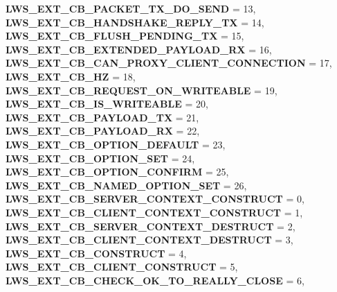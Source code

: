 \begin{DoxyCompactItemize}
{\bfseries L\+W\+S\+\_\+\+E\+X\+T\+\_\+\+C\+B\+\_\+\+P\+A\+C\+K\+E\+T\+\_\+\+T\+X\+\_\+\+D\+O\+\_\+\+S\+E\+ND} = 13, 
\newline
{\bfseries L\+W\+S\+\_\+\+E\+X\+T\+\_\+\+C\+B\+\_\+\+H\+A\+N\+D\+S\+H\+A\+K\+E\+\_\+\+R\+E\+P\+L\+Y\+\_\+\+TX} = 14, 
{\bfseries L\+W\+S\+\_\+\+E\+X\+T\+\_\+\+C\+B\+\_\+\+F\+L\+U\+S\+H\+\_\+\+P\+E\+N\+D\+I\+N\+G\+\_\+\+TX} = 15, 
{\bfseries L\+W\+S\+\_\+\+E\+X\+T\+\_\+\+C\+B\+\_\+\+E\+X\+T\+E\+N\+D\+E\+D\+\_\+\+P\+A\+Y\+L\+O\+A\+D\+\_\+\+RX} = 16, 
{\bfseries L\+W\+S\+\_\+\+E\+X\+T\+\_\+\+C\+B\+\_\+\+C\+A\+N\+\_\+\+P\+R\+O\+X\+Y\+\_\+\+C\+L\+I\+E\+N\+T\+\_\+\+C\+O\+N\+N\+E\+C\+T\+I\+ON} = 17, 
\newline
{\bfseries L\+W\+S\+\_\+\+E\+X\+T\+\_\+\+C\+B\+\_\+HZ} = 18, 
{\bfseries L\+W\+S\+\_\+\+E\+X\+T\+\_\+\+C\+B\+\_\+\+R\+E\+Q\+U\+E\+S\+T\+\_\+\+O\+N\+\_\+\+W\+R\+I\+T\+E\+A\+B\+LE} = 19, 
{\bfseries L\+W\+S\+\_\+\+E\+X\+T\+\_\+\+C\+B\+\_\+\+I\+S\+\_\+\+W\+R\+I\+T\+E\+A\+B\+LE} = 20, 
{\bfseries L\+W\+S\+\_\+\+E\+X\+T\+\_\+\+C\+B\+\_\+\+P\+A\+Y\+L\+O\+A\+D\+\_\+\+TX} = 21, 
\newline
{\bfseries L\+W\+S\+\_\+\+E\+X\+T\+\_\+\+C\+B\+\_\+\+P\+A\+Y\+L\+O\+A\+D\+\_\+\+RX} = 22, 
{\bfseries L\+W\+S\+\_\+\+E\+X\+T\+\_\+\+C\+B\+\_\+\+O\+P\+T\+I\+O\+N\+\_\+\+D\+E\+F\+A\+U\+LT} = 23, 
{\bfseries L\+W\+S\+\_\+\+E\+X\+T\+\_\+\+C\+B\+\_\+\+O\+P\+T\+I\+O\+N\+\_\+\+S\+ET} = 24, 
{\bfseries L\+W\+S\+\_\+\+E\+X\+T\+\_\+\+C\+B\+\_\+\+O\+P\+T\+I\+O\+N\+\_\+\+C\+O\+N\+F\+I\+RM} = 25, 
\newline
{\bfseries L\+W\+S\+\_\+\+E\+X\+T\+\_\+\+C\+B\+\_\+\+N\+A\+M\+E\+D\+\_\+\+O\+P\+T\+I\+O\+N\+\_\+\+S\+ET} = 26, 
{\bfseries L\+W\+S\+\_\+\+E\+X\+T\+\_\+\+C\+B\+\_\+\+S\+E\+R\+V\+E\+R\+\_\+\+C\+O\+N\+T\+E\+X\+T\+\_\+\+C\+O\+N\+S\+T\+R\+U\+CT} = 0, 
{\bfseries L\+W\+S\+\_\+\+E\+X\+T\+\_\+\+C\+B\+\_\+\+C\+L\+I\+E\+N\+T\+\_\+\+C\+O\+N\+T\+E\+X\+T\+\_\+\+C\+O\+N\+S\+T\+R\+U\+CT} = 1, 
{\bfseries L\+W\+S\+\_\+\+E\+X\+T\+\_\+\+C\+B\+\_\+\+S\+E\+R\+V\+E\+R\+\_\+\+C\+O\+N\+T\+E\+X\+T\+\_\+\+D\+E\+S\+T\+R\+U\+CT} = 2, 
\newline
{\bfseries L\+W\+S\+\_\+\+E\+X\+T\+\_\+\+C\+B\+\_\+\+C\+L\+I\+E\+N\+T\+\_\+\+C\+O\+N\+T\+E\+X\+T\+\_\+\+D\+E\+S\+T\+R\+U\+CT} = 3, 
{\bfseries L\+W\+S\+\_\+\+E\+X\+T\+\_\+\+C\+B\+\_\+\+C\+O\+N\+S\+T\+R\+U\+CT} = 4, 
{\bfseries L\+W\+S\+\_\+\+E\+X\+T\+\_\+\+C\+B\+\_\+\+C\+L\+I\+E\+N\+T\+\_\+\+C\+O\+N\+S\+T\+R\+U\+CT} = 5, 
{\bfseries L\+W\+S\+\_\+\+E\+X\+T\+\_\+\+C\+B\+\_\+\+C\+H\+E\+C\+K\+\_\+\+O\+K\+\_\+\+T\+O\+\_\+\+R\+E\+A\+L\+L\+Y\+\_\+\+C\+L\+O\+SE} = 6, 

\end{DoxyCompactItemize}
